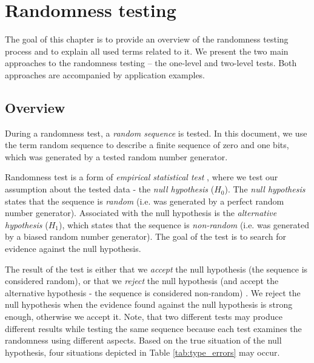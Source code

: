 \documentclass[
  digital,     %
  oneside,     %
  nosansbold,  %
  nocolorbold, %
  nolof,         %
  nolot,         %
]{fithesis4}
\begin{document}

\chapter{Randomness testing} \label{chap:rand}

The goal of this chapter is to provide an overview of the randomness testing process and to explain all used terms related to it. We present the two main approaches to the randomness testing -- the one-level and two-level tests. Both approaches are accompanied by application examples.

\section{Overview} \label{chap:rand-intro}


During a randomness test, a \emph{random sequence} is tested. In this document, we use the term random sequence to describe a finite sequence of zero and one bits, which was generated by a tested random number generator.  %


Randomness test is a form of \emph{empirical statistical test} \cite[p. 2]{tu01_guide}, where we test our assumption about the tested data - the \emph{null hypothesis} ($H_0$). The \emph{null hypothesis} states that the sequence is \emph{random} (i.e. was generated by a perfect random number generator). Associated with the null hypothesis is the \emph{alternative hypothesis} ($H_1$), which states that the sequence is \emph{non-random} (i.e. was generated by a biased random number generator). The goal of the test is to search for evidence against the null hypothesis. 



The result of the test is either that we \emph{accept} the null hypothesis (the sequence is considered random), or that we \emph{reject} the null hypothesis (and accept the alternative hypothesis - the sequence is considered non-random) \cite[p. 417]{basic_practice}. We reject the null hypothesis when the evidence found against the null hypothesis is strong enough, otherwise we accept it. Note, that two different tests may produce different results while testing the same sequence because each test examines the randomness using different aspects. Based on the true situation of the null hypothesis, four situations depicted in Table \ref{tab:type_errors} may occur.
\end{document}
